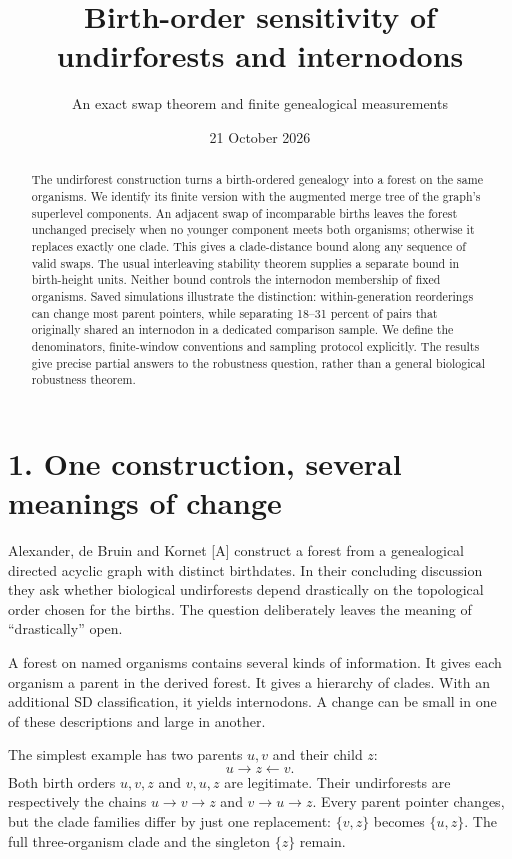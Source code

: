 \documentclass[
  11pt,
  letterpaper,
]{article}
\title{Birth-order sensitivity of undirforests and internodons}
\subtitle{An exact swap theorem and finite genealogical measurements}
\author{}
\date{21 October 2026}
\begin{document}
\maketitle
\begin{abstract}
The undirforest construction turns a birth-ordered genealogy into a
forest on the same organisms. We identify its finite version with the
augmented merge tree of the graph's superlevel components. An adjacent
swap of incomparable births leaves the forest unchanged precisely when
no younger component meets both organisms; otherwise it replaces exactly
one clade. This gives a clade-distance bound along any sequence of valid
swaps. The usual interleaving stability theorem supplies a separate
bound in birth-height units. Neither bound controls the internodon
membership of fixed organisms. Saved simulations illustrate the
distinction: within-generation reorderings can change most parent
pointers, while separating 18--31 percent of pairs that originally
shared an internodon in a dedicated comparison sample. We define the
denominators, finite-window conventions and sampling protocol
explicitly. The results give precise partial answers to the robustness
question, rather than a general biological robustness theorem.
\end{abstract}

\section{1. One construction, several meanings of
change}\label{one-construction-several-meanings-of-change}

Alexander, de Bruin and Kornet {[}A{]} construct a forest from a
genealogical directed acyclic graph with distinct birthdates. In their
concluding discussion they ask whether biological undirforests depend
drastically on the topological order chosen for the births. The question
deliberately leaves the meaning of ``drastically'' open.

A forest on named organisms contains several kinds of information. It
gives each organism a parent in the derived forest. It gives a hierarchy
of clades. With an additional SD classification, it yields internodons.
A change can be small in one of these descriptions and large in another.

The simplest example has two parents \(u,v\) and their child \(z\): \[
                         u\longrightarrow z\longleftarrow v.
\] Both birth orders \(u,v,z\) and \(v,u,z\) are legitimate. Their
undirforests are respectively the chains \(u\to v\to z\) and
\(v\to u\to z\). Every parent pointer changes, but the clade families
differ by just one replacement: \(\{v,z\}\) becomes \(\{u,z\}\). The
full three-organism clade and the singleton \(\{z\}\) remain.
\end{document}
